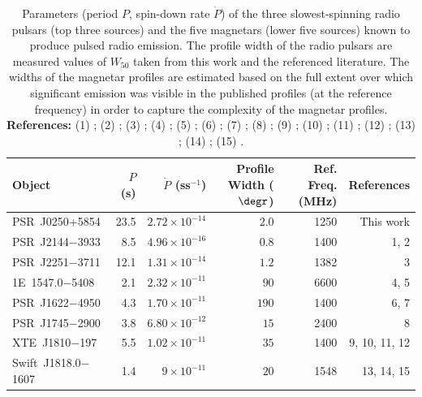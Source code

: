 \begin{table}
	\centering
	\caption[The three slowest rotation-powered pulsars and the five radio-detected magnetars]{Parameters (period $P$, spin-down rate $\dot{P}$) of the three slowest-spinning radio pulsars (top three sources) and the five magnetars (lower five sources) known to produce pulsed radio emission. The profile width of the radio pulsars are measured values of $W_{50}$ taken from this work and the referenced literature. The widths of the magnetar profiles are estimated based on the full extent over which significant emission was visible in the published profiles (at the reference frequency) in order to capture the complexity of the magnetar profiles. \newline \textbf{References:} (1) \citet{YMJx1999}; (2) \citet{MBM+2020}; (3) \citet{MKE+2020}; (4) \citet{CRHR2007a}; (5) \citet{CRJ+2008}; (6) \citet{LBB+2010}; (7) \citet{LBB+2012}; (8) \citet{EFK+2013}; (9) \citet{CRH+2006}; (10) \citet{CRJ+2007b}; (11) \citet{KSJ+2007}; (12) \citet{LLD+2019}; (13) \citet{ERB+2020}; (14) \citet{LSJB2020}; (15) \citet{CCC+2020}.}
	\label{tab: comparison}
	\begin{tabular}{lrrrrr} %
		\hline
	    Object & $P$ (s) & $\dot{P}$ (ss$^{-1}$) & Profile Width ($\degr$) & Ref. Freq. (MHz) & References\\
		\hline
		PSR~J0250+5854          & 23.5 & $2.72\times10^{-14}$ &  $2.0$ & 1250 & This work\\
		PSR~J2144$-$3933        & 8.5  & $4.96\times10^{-16}$ &  $0.8$ & 1400 & 1, 2\\
		PSR~J2251$-$3711        & 12.1 & $1.31\times10^{-14}$ & $1.2$  & 1382 & 3\\
		\hline
		1E~1547.0$-$5408        & 2.1  & $2.32\times10^{-11}$ & $90$   & 6600 & 4, 5\\
        PSR~J1622$-$4950        & 4.3  & $1.70\times10^{-11}$ & $190$  & 1400 & 6, 7\\
        PSR~J1745$-$2900        & 3.8  & $6.80\times10^{-12}$ & $15$   & 2400 & 8\\
        XTE~J1810$-$197          & 5.5  & $1.02\times10^{-11}$ & $35$   & 1400 & 9, 10, 11, 12\\
        Swift~J1818.0$-$1607    & 1.4  & $9\times10^{-11}$    & $20$   & 1548 & 13, 14, 15\\
		\hline
	\end{tabular}
\end{table}

